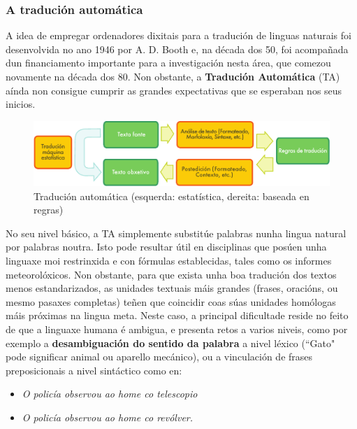 \begin{multicols}{2}
\subsubsection{A tradución automática}

  A idea de empregar ordenadores dixitais para a tradución de linguas naturais foi desenvolvida no ano 1946 por A. D. Booth e, na década dos 50, foi acompañada dun financiamento importante para a investigación nesta área, que comezou novamente na década dos 80. Non obstante, a \textbf{Tradución Automática} (TA) aínda non consigue cumprir as grandes expectativas que se esperaban nos seus inicios. 


\begin{figure}[htb]
  \center
  \includegraphics[width=\textwidth]{../_media/galician/machine_translation}
  \caption{Tradución automática (esquerda: estatística, dereita: baseada en regras)}
  \label{fig:mtarch_ga}
\end{figure}

No seu nivel básico, a TA simplemente substitúe palabras nunha lingua natural por palabras noutra. Isto pode resultar útil en disciplinas que posúen unha linguaxe moi restrinxida e con fórmulas establecidas, tales como os informes meteorolóxicos. Non obstante, para que exista unha boa tradución dos textos menos estandarizados, as unidades textuais máis grandes (frases, oracións, ou mesmo pasaxes completas) teñen que coincidir coas súas unidades homólogas máis próximas na lingua meta. Neste caso, a principal dificultade reside no feito de que a linguaxe humana é ambigua, e presenta retos a varios niveis, como por exemplo a \textbf{desambiguación do sentido da palabra} a nivel léxico (“Gato" pode significar animal ou aparello mecánico), ou a vinculación de frases preposicionais a nivel sintáctico como en:

\begin{itemize}
\item[] \textit{O policía observou ao home co telescopio}
\item[]\textit{O policía observou ao home co revólver.}
\end{itemize}


\end{multicols}
